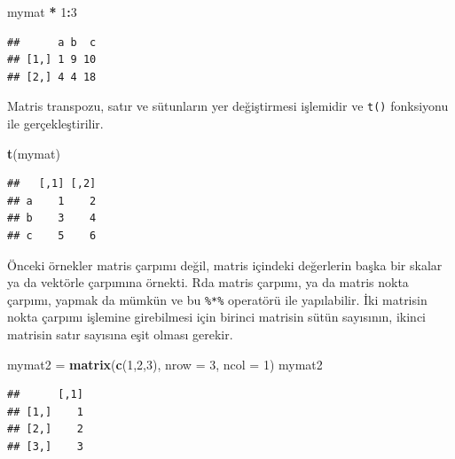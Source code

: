 \documentclass[]{book}
\newenvironment{Shaded}{\begin{snugshade}}{\end{snugshade}}
\newcommand{\DataTypeTok}[1]{\textcolor[rgb]{0.13,0.29,0.53}{#1}}
\newcommand{\DecValTok}[1]{\textcolor[rgb]{0.00,0.00,0.81}{#1}}
\newcommand{\KeywordTok}[1]{\textcolor[rgb]{0.13,0.29,0.53}{\textbf{#1}}}
\newcommand{\NormalTok}[1]{#1}
\newcommand{\OperatorTok}[1]{\textcolor[rgb]{0.81,0.36,0.00}{\textbf{#1}}}
\newcommand{\StringTok}[1]{\textcolor[rgb]{0.31,0.60,0.02}{#1}}
\begin{document}
\begin{Shaded}
\begin{Highlighting}[]
\NormalTok{mymat }\OperatorTok{*}\StringTok{ }\DecValTok{1}\OperatorTok{:}\DecValTok{3}
\end{Highlighting}
\end{Shaded}

\begin{verbatim}
##      a b  c
## [1,] 1 9 10
## [2,] 4 4 18
\end{verbatim}

Matris transpozu, satır ve sütunların yer değiştirmesi işlemidir ve
\texttt{t()} fonksiyonu ile gerçekleştirilir.

\begin{Shaded}
\begin{Highlighting}[]
\KeywordTok{t}\NormalTok{(mymat)}
\end{Highlighting}
\end{Shaded}

\begin{verbatim}
##   [,1] [,2]
## a    1    2
## b    3    4
## c    5    6
\end{verbatim}

Önceki örnekler matris çarpımı değil, matris içindeki değerlerin başka
bir skalar ya da vektörle çarpımına örnekti. Rda matris çarpımı, ya da
matris nokta çarpımı, yapmak da mümkün ve bu \texttt{\%*\%} operatörü
ile yapılabilir. İki matrisin nokta çarpımı işlemine girebilmesi için
birinci matrisin sütün sayısının, ikinci matrisin satır sayısına eşit
olması gerekir.

\begin{Shaded}
\begin{Highlighting}[]
\NormalTok{mymat2 =}\StringTok{ }\KeywordTok{matrix}\NormalTok{(}\KeywordTok{c}\NormalTok{(}\DecValTok{1}\NormalTok{,}\DecValTok{2}\NormalTok{,}\DecValTok{3}\NormalTok{), }\DataTypeTok{nrow =} \DecValTok{3}\NormalTok{, }\DataTypeTok{ncol =} \DecValTok{1}\NormalTok{)}
\NormalTok{mymat2}
\end{Highlighting}
\end{Shaded}

\begin{verbatim}
##      [,1]
## [1,]    1
## [2,]    2
## [3,]    3
\end{verbatim}

\begin{Shaded}
\end{Shaded}
\end{document}

